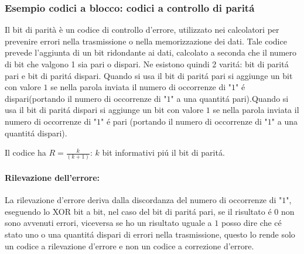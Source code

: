         \subsubsection{Esempio codici a blocco: codici a controllo di paritá}
        Il bit di parità è un codice di controllo d'errore, utilizzato nei calcolatori per prevenire errori nella trasmissione o nella memorizzazione dei dati. 
        Tale codice prevede l'aggiunta di un bit ridondante ai dati, calcolato a seconda che il numero di bit che valgono 1 sia pari o dispari. Ne esistono
        quindi 2 varitá: bit di paritá pari e bit di paritá dispari. Quando si usa il bit di paritá pari si aggiunge un bit con valore $1$ se nella parola inviata
        il numero di occorrenze di "$1$" é dispari(portando il numero di occorrenze di "$1$" a una quantitá pari).Quando si usa il bit di paritá dispari si
        aggiunge un bit con valore $1$ se nella parola inviata il numero di occorrenze di "$1$" é pari (portando il numero di occorrenze di "$1$" a una quantitá dispari).

        \noindent Il codice ha $R = \frac{k}{(k+1)}$: $k$ bit informativi piú il bit di paritá.
        
        \paragraph{Rilevazione dell'errore:}La rilevazione d'errore deriva dalla discordanza del numero di occorrenze di "$1$", eseguendo lo XOR bit a bit, nel caso del bit di paritá pari, se il risultato
        é $0$ non sono avvenuti errori, viceversa se ho un risultato uguale a $1$ posso dire che cé stato uno o una quantitá dispari di errori nella trasmissione, questo lo rende
        solo un codice a rilevazione d'errore e non un codice a correzione d'errore.
        

